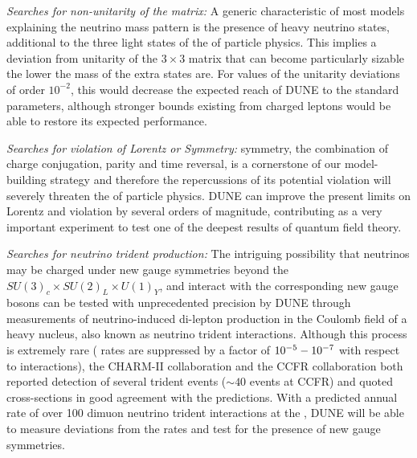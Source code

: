 \textit{Searches for non-unitarity of the  matrix:} A generic characteristic of most models explaining the neutrino mass pattern is the presence of heavy neutrino states, additional to the three light states of the  of particle physics. This implies a deviation from %
unitarity of the $3 \times 3$  matrix that can %
become particularly sizable the lower the mass of the extra states are.  For values of the unitarity deviations of order $10^{-2}$, this would decrease the expected reach of DUNE to the standard parameters, although stronger bounds existing from charged leptons would be able to restore its expected performance.

\textit{Searches for violation of Lorentz or  Symmetry:}  symmetry, the combination of charge conjugation, parity and time reversal, is a cornerstone of our model-building strategy and therefore the repercussions of its potential violation will severely threaten the  of particle physics. DUNE can improve the present limits on Lorentz and  violation by several orders of magnitude, contributing as a very important experiment to test one of the deepest results of quantum field theory.

\textit{Searches for neutrino trident production:} The intriguing possibility that neutrinos may be charged under new gauge symmetries beyond the   $SU(3)_{c} \times SU(2)_{L} \times U(1)_{Y}$, and interact with the corresponding new gauge bosons can be tested with unprecedented precision by DUNE through   measurements of neutrino-induced di-lepton production in the Coulomb field of a heavy nucleus, also known as neutrino trident interactions. Although this process is extremely rare ( rates are suppressed by a factor of $10^{-5} \-- 10^{-7}$ with respect to  interactions), the CHARM-II collaboration and the CCFR collaboration both reported detection of several trident events ($\sim40$ events at CCFR) and quoted cross-sections in good agreement with the  predictions. With a predicted annual rate of over 100 dimuon neutrino trident interactions at the  , DUNE will be able to measure deviations from the  rates and test for the presence of new gauge symmetries.

